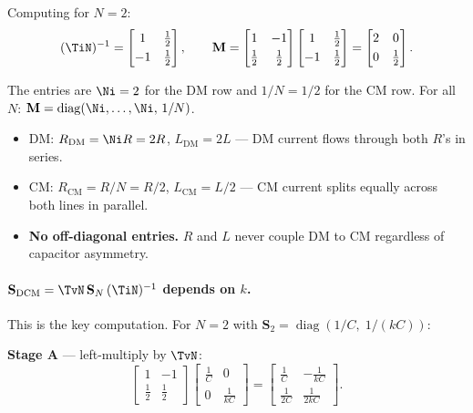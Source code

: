 Computing for $N = 2$:
\[
    (\TiN)^{-1}
    = \begin{bmatrix}1 & \tfrac{1}{2} \\[3pt] -1 & \tfrac{1}{2}\end{bmatrix},
    \qquad
    \mathbf{M}
    =
    \begin{bmatrix}1 & -1 \\[3pt] \tfrac{1}{2} & \tfrac{1}{2}\end{bmatrix}
    \begin{bmatrix}1 & \tfrac{1}{2} \\[3pt] -1 & \tfrac{1}{2}\end{bmatrix}
    =
    \begin{bmatrix}2 & 0 \\[3pt] 0 & \tfrac{1}{2}\end{bmatrix}.
\]

The entries are $\Ni = 2$ for the DM row and $1/N = 1/2$ for the CM
row.  For all $N$:
$\mathbf{M} = \operatorname{diag}(\Ni,\ldots,\Ni,\,1/N)$.

\begin{circuitbox}
\begin{itemize}
    \item DM: $R_{\mathrm{DM}} = \Ni R = 2R$,\; $L_{\mathrm{DM}} = 2L$
          — DM current flows through both $R$'s in series. \checkmark
    \item CM: $R_{\mathrm{CM}} = R/N = R/2$,\; $L_{\mathrm{CM}} = L/2$
          — CM current splits equally across both lines in parallel. \checkmark
    \item \textbf{No off-diagonal entries.}  $R$ and $L$ never couple
          DM to CM regardless of capacitor asymmetry.
\end{itemize}
\end{circuitbox}

\paragraph{$\mathbf{S}_{\mathrm{DCM}} = \TvN\,\mathbf{S}_N\,(\TiN)^{-1}$
depends on $k$.}

This is the key computation.  For $N = 2$ with
$\mathbf{S}_2 = \operatorname{diag}(1/C,\;1/(kC))$:

\textbf{Stage A} — left-multiply by $\TvN$:
\[
\begin{bmatrix}1 & -1 \\[3pt] \tfrac{1}{2} & \tfrac{1}{2}\end{bmatrix}
\begin{bmatrix}\tfrac{1}{C} & 0 \\[3pt] 0 & \tfrac{1}{kC}\end{bmatrix}
=
\begin{bmatrix}
    \tfrac{1}{C}  & -\tfrac{1}{kC} \\[6pt]
    \tfrac{1}{2C} & \tfrac{1}{2kC}
\end{bmatrix}.
\]

